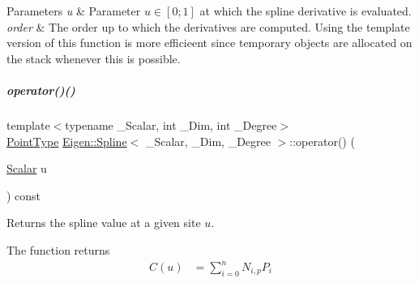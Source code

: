 \begin{DoxyParams}{Parameters}
{\em u} & Parameter $u \in [0;1]$ at which the spline derivative is evaluated. \\
\hline
{\em order} & The order up to which the derivatives are computed. Using the template version of this function is more efficieent since temporary objects are allocated on the stack whenever this is possible. \\
\hline
\end{DoxyParams}
\mbox{\label{group___splines___module_a03058a40af2af81e1ed179d45105b026}} 
\subparagraph{\texorpdfstring{operator()()}{operator()()}\hspace{0.1cm}{\footnotesize\ttfamily [1/2]}}
{\footnotesize\ttfamily template$<$typename \+\_\+\+Scalar, int \+\_\+\+Dim, int \+\_\+\+Degree$>$ \\
\hyperlink{group___splines___module_a9ade8a2f81dae6eedb8845cb080672bd}{Point\+Type} \hyperlink{group___splines___module_class_eigen_1_1_spline}{Eigen\+::\+Spline}$<$ \+\_\+\+Scalar, \+\_\+\+Dim, \+\_\+\+Degree $>$\+::operator() (\begin{DoxyParamCaption}\item[{\hyperlink{group___splines___module_a8cafd78b564825c76fbb3419653d9742}{Scalar}}]{u }\end{DoxyParamCaption}) const}



Returns the spline value at a given site $u$. 

The function returns \begin{align*} C(u) & = \sum_{i=0}^{n}N_{i,p}P_i \end{align*}


